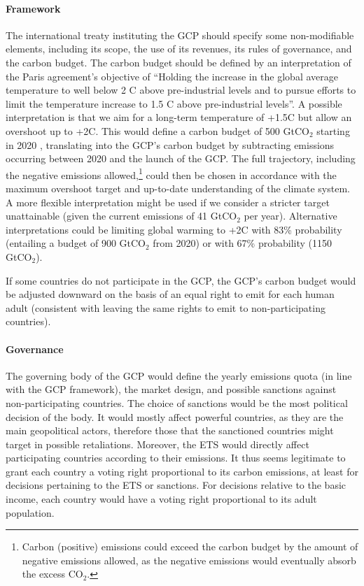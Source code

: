\documentclass[12pt,english]{article}
\begin{document}
\paragraph{Framework} 
The international treaty instituting the GCP should specify some non-modifiable elements, including its scope, the use of its revenues, its rules of governance, and the carbon budget. The carbon budget should be defined by an interpretation of the Paris agreement's objective of 
``Holding the increase in the global average temperature to well below 2 \textdegree{}C above pre-industrial levels and to pursue efforts to limit the temperature increase to 1.5 \textdegree{}C above pre-industrial levels''. A possible interpretation is that we aim for a long-term temperature of +1.5\textdegree{}C but allow an overshoot up to +2\textdegree{}C. 
This would define a carbon budget of 500 GtCO$_\text{2}$ starting in 2020 \citep{ipcc_climate_2021}, translating into the GCP's carbon budget by subtracting emissions occurring between 2020 and the launch of the GCP. The full trajectory, including the negative emissions allowed,\footnote{Carbon (positive) emissions could exceed the carbon budget by the amount of negative emissions allowed, as the negative emissions would eventually absorb the excess CO$_\text{2}$.} could then be chosen in accordance with the maximum overshoot target and up-to-date understanding of the climate system. A more flexible interpretation might be used if we consider a stricter target unattainable (given the current emissions of 41 GtCO$_\text{2}$ per year). Alternative interpretations could be limiting global warming to +2\textdegree{}C with 83\% probability (entailing a budget of 900 GtCO$_\text{2}$ from 2020) or with 67\% probability (1150 GtCO$_\text{2}$). %

If some countries do not participate in the GCP, the GCP's carbon budget would be adjusted downward on the basis of an equal right to emit for each human adult (consistent with leaving the same rights to emit to non-participating countries).

\paragraph{Governance} 
The governing body of the GCP would define the yearly emissions quota (in line with the GCP framework), the market design, and possible sanctions against non-participating countries. The choice of sanctions would be the most political decision of the body. It would mostly affect powerful countries, as they are the main geopolitical actors, therefore those that the sanctioned countries might target in possible retaliations. Moreover, the ETS would directly affect participating countries according to their emissions. It thus seems legitimate to grant each country a voting right proportional to its carbon emissions, at least for decisions pertaining to the ETS or sanctions. For decisions relative to the basic income, each country would have a voting right proportional to its adult population. 
\end{document}
